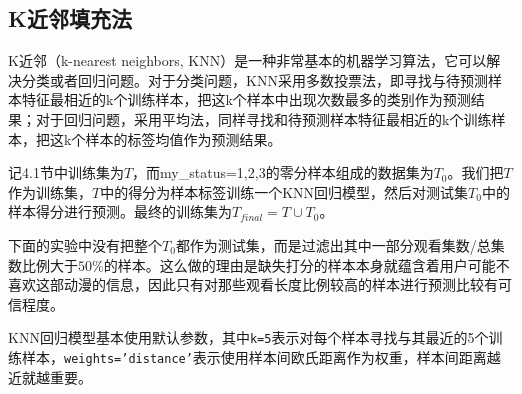     \subsection{K近邻填充法}
    K近邻（k-nearest neighbors, KNN）是一种非常基本的机器学习算法，它可以解决分类或者回归问题。对于分类问题，KNN采用多数投票法，即寻找与待预测样本特征最相近的k个训练样本，把这k个样本中出现次数最多的类别作为预测结果；对于回归问题，采用平均法，同样寻找和待预测样本特征最相近的k个训练样本，把这k个样本的标签均值作为预测结果。

    记4.1节中训练集为$T$，而my\_status=1,2,3的零分样本组成的数据集为$T_0$。我们把$T$作为训练集，$T$中的得分为样本标签训练一个KNN回归模型，然后对测试集$T_0$中的样本得分进行预测。最终的训练集为$T_{final}=T\cup T_0$。

    下面的实验中没有把整个$T_0$都作为测试集，而是过滤出其中一部分观看集数/总集数比例大于$50\%$的样本。这么做的理由是缺失打分的样本本身就蕴含着用户可能不喜欢这部动漫的信息，因此只有对那些观看长度比例较高的样本进行预测比较有可信程度。

    KNN回归模型基本使用默认参数，其中\texttt{k=5}表示对每个样本寻找与其最近的5个训练样本，\texttt{weights='distance'}表示使用样本间欧氏距离作为权重，样本间距离越近就越重要。

